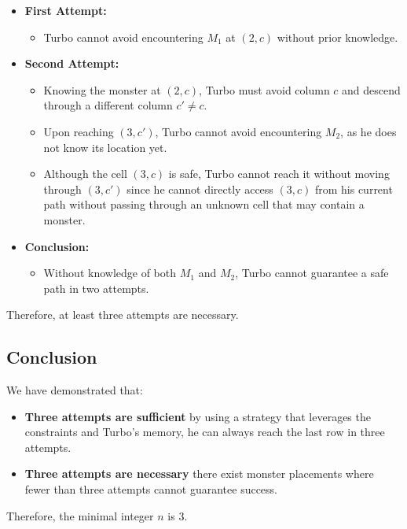 \begin{tcolorbox}[enhanced, breakable, rounded corners,
    colback=gray!5!white, colframe=gray!75!black,
    colbacktitle=gray!85!black, fonttitle=\bfseries, coltitle=white, title=2024 IMO Problem 5]
\begin{itemize}
    \item \textbf{First Attempt:}
    \begin{itemize}
        \item Turbo cannot avoid encountering \( M_1 \) at \( (2, c) \) without prior knowledge.
    \end{itemize}
    \item \textbf{Second Attempt:}
    \begin{itemize}
        \item Knowing the monster at \( (2, c) \), Turbo must avoid column \( c \) and descend through a different column \( c' \neq c \).
        \item Upon reaching \( (3, c') \), Turbo cannot avoid encountering \( M_2 \), as he does not know its location yet.
        \item Although the cell \( (3, c) \) is safe, Turbo cannot reach it without moving through \( (3, c') \) since he cannot directly access \( (3, c) \) from his current path without passing through an unknown cell that may contain a monster.
    \end{itemize}
    \item \textbf{Conclusion:}
    \begin{itemize}
        \item Without knowledge of both \( M_1 \) and \( M_2 \), Turbo cannot guarantee a safe path in two attempts.
    \end{itemize}
\end{itemize}

Therefore, at least three attempts are necessary.

\subsection*{Conclusion}

We have demonstrated that:

\begin{itemize}
    \item \textbf{Three attempts are sufficient} by using a strategy that leverages the constraints and Turbo's memory, he can always reach the last row in three attempts.
    \item \textbf{Three attempts are necessary} there exist monster placements where fewer than three attempts cannot guarantee success.
\end{itemize}

Therefore, the minimal integer $ n $ is $ 3 $.

\end{tcolorbox}
